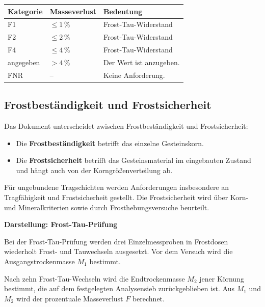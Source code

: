 \documentclass[
  12pt,
  a4paper,
  oneside
]{scrreprt}
\begin{document}
\begin{longtable}{
  >{\centering\arraybackslash}p{}
  >{\centering\arraybackslash}p{}
  >{\raggedright\arraybackslash}p{}
}
\toprule
\textbf{Kategorie} &
\textbf{Masseverlust} &
\textbf{Bedeutung} \\
\midrule
\endhead

F1 &
$\leq 1\,\%$ &
Frost-Tau-Widerstand \\

F2 &
$\leq 2\,\%$ &
Frost-Tau-Widerstand \\

F4 &
$\leq 4\,\%$ &
Frost-Tau-Widerstand \\

angegeben &
$>4\,\%$ &
Der Wert ist anzugeben. \\

FNR &
-- &
Keine Anforderung. \\

\bottomrule
\end{longtable}



\subsection{Frostbeständigkeit und Frostsicherheit}

Das Dokument unterscheidet zwischen Frostbeständigkeit und
Frostsicherheit:

\begin{itemize}
  \item Die \textbf{Frostbeständigkeit} betrifft das einzelne
  Gesteinskorn.

  \item Die \textbf{Frostsicherheit} betrifft das Gesteinsmaterial
  im eingebauten Zustand und hängt auch von der Korngrößenverteilung ab.
\end{itemize}



Für ungebundene Tragschichten werden Anforderungen insbesondere an
Tragfähigkeit und Frostsicherheit gestellt. Die Frostsicherheit wird
über Korn- und Mineralkriterien sowie durch Frosthebungsversuche
beurteilt. 

\begin{darstellungsbox}
\textbf{Darstellung: Frost-Tau-Prüfung}

Bei der Frost-Tau-Prüfung werden drei Einzelmessproben in Frostdosen
wiederholt Frost- und Tauwechseln ausgesetzt. Vor dem Versuch wird die
Ausgangstrockenmasse $M_1$ bestimmt.

Nach zehn Frost-Tau-Wechseln wird die Endtrockenmasse $M_2$ jener
Körnung bestimmt, die auf dem festgelegten Analysensieb
zurückgeblieben ist. Aus $M_1$ und $M_2$ wird der prozentuale
Masseverlust $F$ berechnet.
\end{darstellungsbox}
\end{document}
